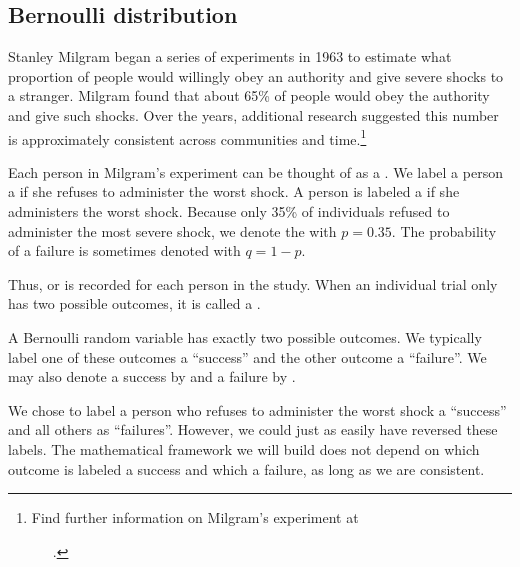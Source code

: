 \subsection{Bernoulli distribution}
\label{bernoulli}


Stanley Milgram began a series of experiments in 1963 to estimate what proportion of people would willingly obey an authority and give severe shocks to a stranger. Milgram found that about 65\% of people would obey the authority and give such shocks. Over the years, additional research suggested this number is approximately consistent across communities and time.\footnote{Find further information on Milgram's experiment at \par \ \ \hspace{0.2mm}\ .}

Each person in Milgram's experiment can be thought of as a . We label a person a  if she refuses to administer the worst shock. A person is labeled a  if she administers the worst shock. Because only 35\% of individuals refused to administer the most severe shock, we denote the  with $p=0.35$. The probability of a failure is sometimes denoted with $q=1-p$.

Thus,  or  is recorded for each person in the study. When an individual trial only has two possible outcomes, it is called a .

\begin{termBox}{
A Bernoulli random variable has exactly two possible outcomes. We typically label one of these outcomes a ``success'' and the other outcome a ``failure''. We may also denote a success by  and a failure by .}
\end{termBox}

\begin{tipBox}{
We chose to label a person who refuses to administer the worst shock a ``success'' and all others as ``failures''. However, we could just as easily have reversed these labels. The mathematical framework we will build does not depend on which outcome is labeled a success and which a failure, as long as we are consistent.}
\end{tipBox}

